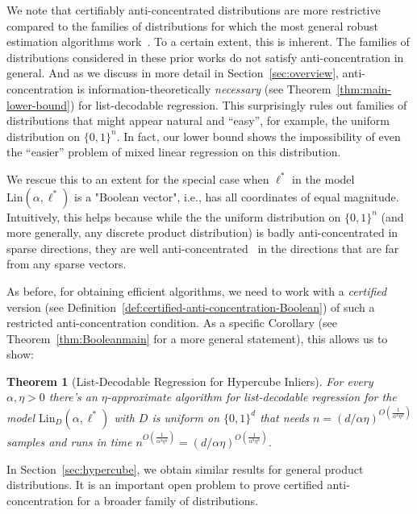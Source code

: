 \documentclass{article}
\newtheorem{theorem}{Theorem}[section]
\theoremstyle{definition}
\theoremstyle{remark}
\newcommand{\set}[1]{\{#1\}}
\numberwithin{equation}{section}
\newcommand*{\zo}{\set{0,1}}
\newcommand{\1}{\bm{1}}
\newcommand{\Lin}{\mathrm{Lin}}
\begin{document}
We note that certifiably anti-concentrated distributions are more restrictive compared to the families of distributions for which the most general robust estimation algorithms work~\cite{2017KS,KothariSteinhardt17,DBLP:conf/colt/KlivansKM18}. To a certain extent, this is inherent. The families of distributions considered in these prior works do not satisfy anti-concentration in general.  And as we discuss in more detail in Section~\ref{sec:overview}, anti-concentration is information-theoretically \emph{necessary} (see Theorem~\ref{thm:main-lower-bound}) for list-decodable regression. This surprisingly rules out families of distributions that might appear natural and ``easy'', for example, the uniform distribution on $\zo^n$. In fact, our lower bound shows the impossibility of even the ``easier'' problem of mixed linear regression on this distribution.

We rescue this to an extent for the special case when $\ell^*$ in the model $\Lin(\alpha,\ell^*)$ is a "Boolean vector", i.e., has all coordinates of equal magnitude. Intuitively, this helps because  while the the uniform distribution on $\zo^n$ (and more generally, any discrete product distribution) is badly anti-concentrated in sparse directions, they are well anti-concentrated~\cite{ErdosLittlewoodOfford} in the directions that are far from any sparse vectors. 

As before, for obtaining efficient algorithms, we need to work with a \emph{certified} version (see Definition~\ref{def:certified-anti-concentration-Boolean}) of such a restricted anti-concentration condition. As a specific Corollary (see Theorem~\ref{thm:Booleanmain} for a more general statement), this allows us to show:
\begin{theorem}[List-Decodable Regression for Hypercube Inliers] \label{thm:boolcube}
	For every $\alpha, \eta > 0$ there's an $\eta$-approximate algorithm for list-decodable regression for the model $\Lin_D(\alpha,\ell^*)$ with $D$ is uniform on $\zo^d$ that needs $n = (d/\alpha \eta)^{O(\frac{1}{\alpha^4 \eta^4})}$  samples and runs in time $n^{O(\frac{1}{\alpha^4 \eta^4})} = (d/\alpha \eta)^{O(\frac{1}{\alpha^8 \eta^8})}$.
\end{theorem} 

In Section~\ref{sec:hypercube}, we obtain similar results for general product distributions. It is an important open problem to prove certified anti-concentration for a broader family of distributions. %
\end{document}
